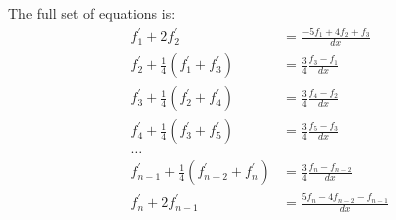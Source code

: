 \documentclass[8pt]{beamer}
\begin{document}
\begin{frame}
\footnotesize
The full set of equations is:
\begin{align*}
    f^{\prime}_1 + 2f^{\prime}_2 &= \frac{-5f_1 + 4f_2 + f_3}{dx} \\
    f_2^{\prime} + \frac{1}{4}(f^{\prime}_{1} + f^{\prime}_{3}) &=
        \frac{3}{4}\frac{f_{3} - f_{1}}{dx} \\
    f_3^{\prime} + \frac{1}{4}(f^{\prime}_{2} + f^{\prime}_{4}) &=
        \frac{3}{4}\frac{f_{4} - f_{2}}{dx} \\
    f_4^{\prime} + \frac{1}{4}(f^{\prime}_{3} + f^{\prime}_{5}) &=
        \frac{3}{4}\frac{f_{5} - f_{3}}{dx} \\
    \hdots& \\
    f_{n-1}^{\prime} + \frac{1}{4}(f^{\prime}_{n-2} + f^{\prime}_{n}) &=
        \frac{3}{4}\frac{f_{n} - f_{n-2}}{dx} \\
    f^{\prime}_{n} + 2f^{\prime}_{n-1} &=
        \frac{5f_{n} - 4f_{n-2} -  f_{n-1}}{dx}
\end{align*}
\end{frame}
\end{document}
